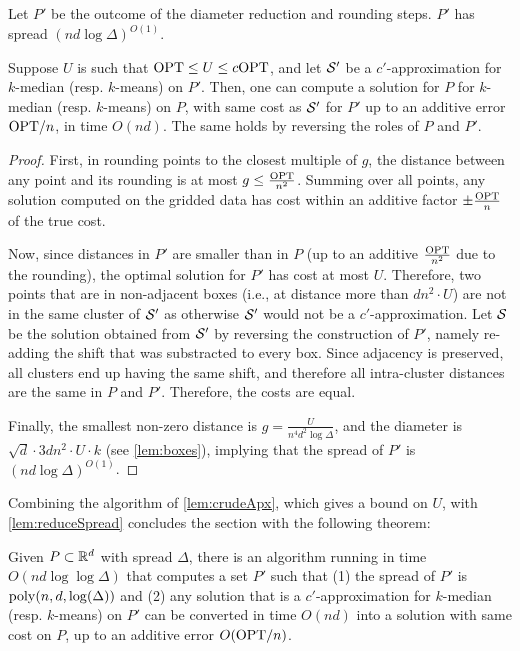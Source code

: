 \begin{lemma}\label{lem:reduceSpread}
Let $P'$ be the outcome of the diameter reduction and rounding steps. $P'$ has spread $(nd \log \Delta)^{O(1)}$.

Suppose $U$ is such that $\text{OPT} \leq U \leq c \text{OPT}$, and let $\mathcal S'$ be a $c'$-approximation for  $k$-median (resp. $k$-means) on $P'$.  Then, one can compute
a solution for $P$ for $k$-median (resp. $k$-means) on $P$, with same cost as $\mathcal S'$ for $P'$ up to an additive error $\text{OPT} / n$, in time $O(nd)$. The same
holds by reversing the roles of $P$ and $P'$.
\end{lemma}
\begin{proof}
First, in rounding points to the closest multiple of $g$,
  the distance between any point and its rounding is at most $g \leq \frac{\text{OPT}}{n^2}$. Summing over all points,
any solution computed on the gridded data has cost within an additive factor $\pm \frac{\text{OPT}}{n}$ of the true cost. 

Now, since distances in $P'$ are smaller than in $P$ (up to an additive $\frac{\text{OPT}}{n^2}$ due to the rounding), the optimal solution for $P'$ has cost at most
$U$. Therefore, two points that are in non-adjacent boxes (i.e., at distance more than $d n^2\cdot U$) are not in the same cluster of $\mathcal S'$ as otherwise
$\mathcal S'$ would not be a $c'$-approximation.  Let $\mathcal S$ be the solution obtained from $\mathcal S'$ by reversing the construction of $P'$, namely re-adding the
shift that was substracted to every box. Since adjacency is preserved, all clusters end up having the same shift, and therefore all intra-cluster distances are
the same in $P$ and $P'$. Therefore, the costs are equal.

Finally, the smallest
non-zero distance is $g = \frac{U}{n^4 d^{2} \log \Delta}$, and the diameter is $\sqrt{d} \cdot 3d n^2\cdot U \cdot k$ (see \cref{lem:boxes}), implying that the spread of $P'$ is $(nd \log \Delta)^{O(1)}$.
\end{proof}

Combining the algorithm of \cref{lem:crudeApx}, which gives a bound on $U$, with \cref{lem:reduceSpread} concludes the section with the following theorem:

\begin{theorem}
Given $P \subset \mathbb{R}^d$ with spread $\Delta$, there is an algorithm running in time $O(nd \log \log \Delta)$ that computes a set $P'$ such that (1) the spread of
$P'$ is $\operatorname{poly}(n,d, \log(\Delta))$ and (2) any solution that is a $c'$-approximation for  $k$-median (resp. $k$-means) on $P'$ can be converted in time $O(nd)$
into a solution with same cost on $P$, up to an additive error $O(\text{OPT} / n)$.
\end{theorem}
